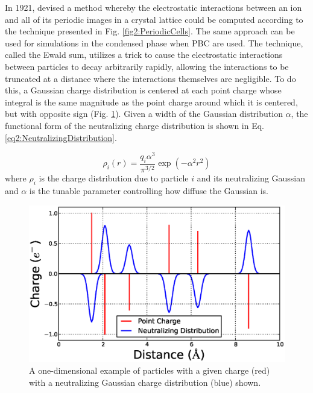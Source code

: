 In 1921, \citeauthor{Ewald_AnnPhys_1921_v64_p253} devised a method whereby the
electrostatic interactions between an ion and all of its periodic images in a
crystal lattice could be computed according to the technique presented in Fig.
\ref{fig2:PeriodicCells}. \cite{Ewald_AnnPhys_1921_v64_p253} The same approach
can be used for simulations in the condensed phase when PBC are used.  The
technique, called the Ewald sum, utilizes a trick to cause the electrostatic
interactions between particles to decay arbitrarily rapidly, allowing the
interactions to be truncated at a distance where the interactions themselves are
negligible. To do this, a Gaussian charge distribution is centered at each point
charge whose integral is the same magnitude as the point charge around which it
is centered, but with opposite sign (Fig. \ref{fig2:Ewald}). Given a width of
the Gaussian distribution $\alpha$, the functional form of the neutralizing
charge distribution is shown in Eq. \ref{eq2:NeutralizingDistribution}.

\begin{equation}
   \rho_i(r) = \frac{q_i \alpha ^ 3} {\pi ^ {3/2}} \exp \left( -\alpha ^ 2 r^2
               \right)
   \label{eq2:NeutralizingDistribution}
\end{equation}
where $\rho_i$ is the charge distribution due to particle $i$ and its
neutralizing Gaussian and $\alpha$ is the tunable parameter controlling how
diffuse the Gaussian is.

\begin{figure}
   \includegraphics[width=6.5in]{Ewald.ps}
   \caption{A one-dimensional example of particles with a given charge (red)
            with a neutralizing Gaussian charge distribution (blue) shown.}
   \label{fig2:Ewald}
\end{figure}

